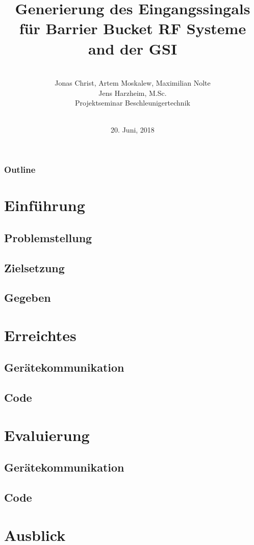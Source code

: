 \documentclass[colorbacktitle,inverttitle,landscape,presentation,
	english,
	aspectratio=43, %
	accentcolor=tud9b, %
]{tudbeamer}
\date{20. Juni, 2018}
\title{Generierung des Eingangssingals für Barrier Bucket RF Systeme and der GSI }
\subtitle{\\[0.3\baselineskip]
	Jonas Christ, Artem Moskalew, Maximilian Nolte \\
{\small Jens Harzheim, M.Sc.}\\
[0.3\baselineskip]
{\tiny Projektseminar Beschleunigertechnik}\\[0.3em]
	\mbox{\scriptsize}~}
\institute[TU Darmstadt | Fachbereich 18 | Institut Theorie Elektromagnetischer Felder]{Institut für Theorie Elektromagnetischer Felder, TU Darmstadt}
\begin{document}
	
\begin{titleframe}
	\end{titleframe}
	
\begin{frame}
	\frametitle{Outline}
	\tableofcontents%
\end{frame}
	

\section{Einführung}

\subsection{Problemstellung}


\subsection{Zielsetzung}


\subsection{Gegeben}


\section{Erreichtes}

\subsection{Gerätekommunikation}


\subsection{Code}


\section{Evaluierung}
\subsection{Gerätekommunikation}


\subsection{Code}


\section{Ausblick}

	
	
\end{document}
